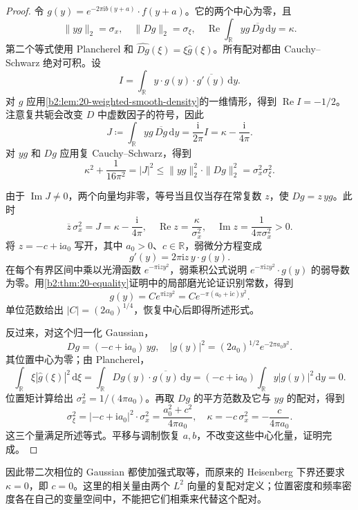 \begin{proof}
令 \(g(y)=e^{-2\pi\mathrm i b(y+a)}\cdot f(y+a)\)。它的两个中心为零，且
\[
 \|yg\|_2=\sigma_x,
 \quad
 \|Dg\|_2=\sigma_\xi,
 \quad
 \operatorname{Re}\int_{\mathbb R}yg\,\overline{Dg}\,\mathrm dy
 =\kappa.
\]
第二个等式使用 Plancherel 和 \(\widehat{Dg}(\xi)=\xi\widehat g(\xi)\)。所有配对都由 Cauchy--Schwarz 绝对可积。设
\[
 I=\int_{\mathbb R}y\cdot g(y)\cdot\overline{g'(y)}\,\mathrm dy.
\]
对 \(g\) 应用\cref{b2:lem:20-weighted-smooth-density}的一维情形，得到 \(\operatorname{Re}I=-1/2\)。注意复共轭会改变 \(D\) 中虚数因子的符号，因此
\[
 J\coloneqq\int_{\mathbb R}yg\,\overline{Dg}\,\mathrm dy
 =\frac{\mathrm i}{2\pi}I
 =\kappa-\frac{\mathrm i}{4\pi}.
\]
对 \(yg\) 和 \(Dg\) 应用复 Cauchy--Schwarz，得到
\[
 \kappa^2+\frac1{16\pi^2}
 =|J|^2
 \leq\|yg\|_2^2\cdot\|Dg\|_2^2
 =\sigma_x^2\sigma_\xi^2.
\]

由于 \(\operatorname{Im}J\neq0\)，两个向量均非零，等号当且仅当存在常复数 \(z\)，使 \(Dg=z\,yg\)。此时
\[
 \overline z\,\sigma_x^2=J
 =\kappa-\frac{\mathrm i}{4\pi},
 \quad
 \operatorname{Re}z=\frac{\kappa}{\sigma_x^2},
 \quad
 \operatorname{Im}z=\frac1{4\pi\sigma_x^2}>0.
\]
将 \(z=-c+\mathrm i a_0\) 写开，其中 \(a_0>0\)、\(c\in\mathbb R\)，弱微分方程变成
\[
 g'(y)=2\pi\mathrm i z\,y\cdot g(y).
\]
在每个有界区间中乘以光滑函数 \(e^{-\pi\mathrm i zy^2}\)，弱乘积公式说明 \(e^{-\pi\mathrm i zy^2}\cdot g(y)\) 的弱导数为零。用\cref{b2:thm:20-equality}证明中的局部磨光论证识别常数，得到
\[
 g(y)=C e^{\pi\mathrm i zy^2}
     =C e^{-\pi(a_0+\mathrm ic)y^2}.
\]
单位范数给出 \(|C|=(2a_0)^{1/4}\)，恢复中心后即得所述形式。

反过来，对这个归一化 Gaussian，
\[
 Dg=(-c+\mathrm i a_0)\,yg,
 \quad
 |g(y)|^2=(2a_0)^{1/2}e^{-2\pi a_0y^2}.
\]
其位置中心为零；由 Plancherel，
\[
 \int_{\mathbb R}\xi|\widehat g(\xi)|^2\,\mathrm d\xi
 =\int_{\mathbb R}Dg(y)\cdot\overline{g(y)}\,\mathrm dy
 =(-c+\mathrm i a_0)\int_{\mathbb R}y|g(y)|^2\,\mathrm dy=0.
\]
位置矩计算给出 \(\sigma_x^2=1/(4\pi a_0)\)。再取 \(Dg\) 的平方范数及它与 \(yg\) 的配对，得到
\[
 \sigma_\xi^2
 =|{-c+\mathrm i a_0}|^2\cdot\sigma_x^2
 =\frac{a_0^2+c^2}{4\pi a_0},
 \quad
 \kappa=-c\,\sigma_x^2=-\frac{c}{4\pi a_0}.
\]
这三个量满足所述等式。平移与调制恢复 \(a,b\)，不改变这些中心化量，证明完成。
\end{proof}

因此带二次相位的 Gaussian 都使加强式取等，而原来的 Heisenberg 下界还要求 \(\kappa=0\)，即 \(c=0\)。这里的相关量由两个 \(L^2\) 向量的复配对定义；位置密度和频率密度各在自己的变量空间中，不能把它们相乘来代替这个配对。

